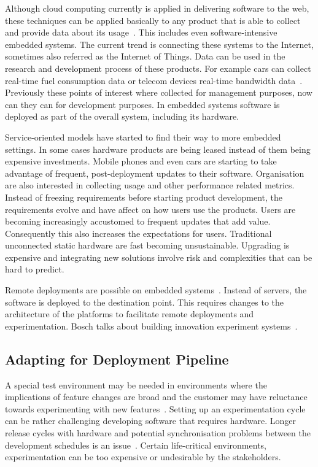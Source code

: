 \documentclass[english]{tktltiki2}
\begin{document}
Although cloud computing currently is applied in delivering software to the web, these techniques can be applied basically to any product that is able to collect and provide data about its usage~\cite{Bos12}. This includes even software-intensive embedded systems. The current trend is connecting these systems to the Internet, sometimes also referred as the Internet of Things. Data can be used in the research and development process of these products. For example cars can collect real-time fuel consumption data or telecom devices real-time bandwidth data~\cite{Bos12}. Previously these points of interest where collected for management purposes, now can they can for development purposes. In embedded systems software is deployed as part of the overall system, including its hardware.

Service-oriented models have started to find their way to more embedded settings. In some cases hardware products are being leased instead of them being expensive investments. Mobile phones and even cars are starting to take advantage of frequent, post-deployment updates to their software. Organisation are also interested in collecting usage and other performance related metrics. Instead of freezing requirements before starting product development, the requirements evolve and have affect on how users use the products. Users are becoming increasingly accustomed to frequent updates that add value. Consequently this also increases the expectations for users. Traditional unconnected static hardware are fast becoming unsustainable. Upgrading is expensive and integrating new solutions involve risk and complexities that can be hard to predict.

Remote deployments are possible on embedded systems~\cite{Bos12}. Instead of servers, the software is deployed to the destination point. This requires changes to the architecture of the platforms to facilitate remote deployments and experimentation. Bosch talks about building innovation experiment systems~\cite{Bos12}.

\subsection{Adapting for Deployment Pipeline}

A special test environment may be needed in environments where the implications of feature changes are broad and the customer may have reluctance towards experimenting with new features~\cite{FGM14}. Setting up an experimentation cycle can be rather challenging developing software that requires hardware. Longer release cycles with hardware and potential synchronisation problems between the development schedules is an issue~\cite{FGM14}. Certain life-critical environments, experimentation can be too expensive or undesirable by the stakeholders.
\end{document}
